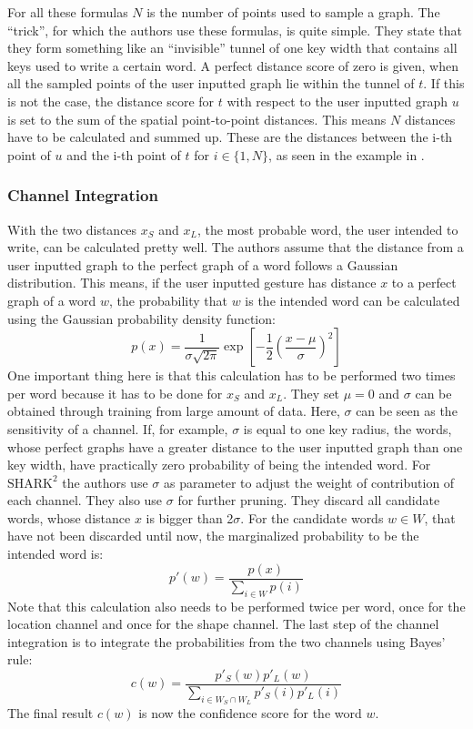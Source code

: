 For all these formulas $N$ is the number of points used to sample a graph. The ``trick'', for which the authors use these formulas, is quite simple. They state that they form something like an ``invisible'' tunnel of one key width that contains all keys used to write a certain word. A perfect distance score of zero is given, when all the sampled points of the user inputted graph lie within the tunnel of $t$. If this is not the case, the distance score for $t$ with respect to the user inputted graph $u$ is set to the sum of the spatial point-to-point distances. This means $N$ distances have to be calculated and summed up. These are the distances between the i-th point of $u$ and the i-th point of $t$ for $i \in \{1,N\}$, as seen in the example in .

\subsubsection{Channel Integration}
With the two distances $x_S$ and $x_L$, the most probable word, the user intended to write, can be calculated pretty well. The authors assume that the distance from a user inputted graph to the perfect graph of a word follows a Gaussian distribution. This means, if the user inputted gesture has distance $x$ to a perfect graph of a word $w$, the probability that $w$ is the intended word can be calculated using the Gaussian probability density function:
\begin{equation}
    p(x) = \frac{1}{\sigma\sqrt{2\pi}}\exp\left[{-\frac{1}{2}}\left(\frac{x-\mu}{\sigma}\right)^2\right]
    \label{eqn:gaussian}
\end{equation}
One important thing here is that this calculation has to be performed two times per word because it has to be done for $x_S$ and $x_L$. They set $\mu = 0$ and $\sigma$ can be obtained through training from large amount of data. Here, $\sigma$ can be seen as the sensitivity of a channel. If, for example, $\sigma$ is equal to one key radius, the words, whose perfect graphs have a greater distance to the user inputted graph than one key width, have practically zero probability of being the intended word. For $\text{SHARK}^2$ the authors use $\sigma$ as parameter to adjust the weight of contribution of each channel. They also use $\sigma$ for further pruning. They discard all candidate words, whose distance $x$ is bigger than 2$\sigma$. For the candidate words $w \in W$, that have not been discarded until now, the marginalized probability to be the intended word is: 
\begin{equation}
    p'(w) = \frac{p(x)}{\sum\limits_{i \in W}p(i)}
\end{equation}
Note that this calculation also needs to be performed twice per word, once for the location channel and once for the shape channel. The last step of the channel integration is to integrate the probabilities from the two channels using Bayes' rule:
\begin{equation}
    c(w) = \frac{p'_S(w)p'_L(w)}{\sum\limits_{i \in W_S \cap W_L}p'_S(i)p'_L(i)}
\end{equation}
The final result $c(w)$ is now the confidence score for the word $w$.

